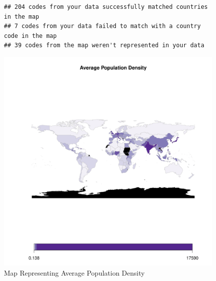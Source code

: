 \documentclass{article}\usepackage[]{graphicx}\usepackage[]{xcolor}
\makeatletter
\def\maxwidth{ %
  \ifdim\Gin@nat@width>\linewidth
    \linewidth
  \else
    \Gin@nat@width
  \fi
}
\newenvironment{kframe}{%
 \def\at@end@of@kframe{}%
 \ifinner\ifhmode%
  \def\at@end@of@kframe{\end{minipage}}%
  \begin{minipage}{\columnwidth}%
 \fi\fi%
 \def\FrameCommand##1{\hskip\@totalleftmargin \hskip-\fboxsep
 \colorbox{shadecolor}{##1}\hskip-\fboxsep
     \hskip-\linewidth \hskip-\@totalleftmargin \hskip\columnwidth}%
 \MakeFramed {\advance\hsize-\width
   \@totalleftmargin\z@ \linewidth\hsize
   \@setminipage}}%
 {\par\unskip\endMakeFramed%
 \at@end@of@kframe}
\newenvironment{knitrout}{}{} %
\makeatother
\begin{document}
\newpage
\begin{figure}[h!]
\centering
\begin{knitrout}
\color{fgcolor}\begin{kframe}
\begin{verbatim}
## 204 codes from your data successfully matched countries in the map
## 7 codes from your data failed to match with a country code in the map
## 39 codes from the map weren't represented in your data
\end{verbatim}
\end{kframe}
\includegraphics[width=\maxwidth]{figure/unnamed-chunk-24-1} 
\end{knitrout}
\caption{Map Representing Average Population Density}

\label{fig}
\end{figure}

\newpage
\end{document}
